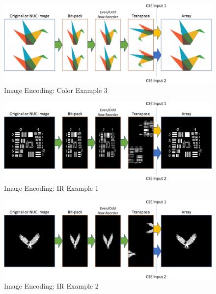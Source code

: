     \begin{figure}
        \centering
        \includegraphics[trim=0in 0in 0in 0in,width=1.0\textwidth]{fig/image_encoding_origami.pdf}
        \caption{Image Encoding: Color Example 3}
        \label{fig:image_encoding_color_example3}
    \end{figure}

    \begin{figure}
        \centering
        \includegraphics[trim=0in 0in 0in 0in,width=1.0\textwidth]{fig/image_encoding_ir1.pdf}
        \caption{Image Encoding: IR Example 1}
        \label{fig:image_encoding_ir_example1}
    \end{figure}

    \begin{figure}
        \centering
        \includegraphics[trim=0in 0in 0in 0in,width=1.0\textwidth]{fig/image_encoding_ir2.pdf}
        \caption{Image Encoding: IR Example 2}
        \label{fig:image_encoding_ir_example2}
    \end{figure}


